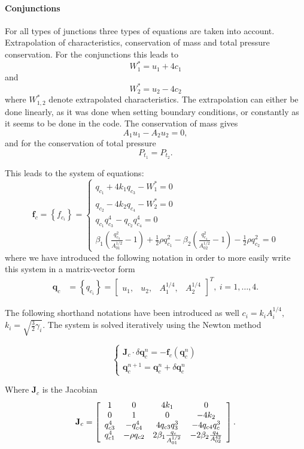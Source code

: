 \documentclass[a4paper, oneside]{discothesis}
\begin{document}
\paragraph{Conjunctions} \label{par:conjunctions}
For all types of junctions three types of equations are taken into account. 
Extrapolation of characteristics, conservation of mass and total pressure conservation.
For the conjunctions this leads to
$$
W_1^*=u_1+4 c_1
$$
and 
$$
W_2^*=u_2-4 c_2
$$
where $W_{1,2}^*$ denote extrapolated characteristics. 
The extrapolation can either be done linearly, as it was done when setting boundary conditions, or constantly as it seems to be done in the code. 
The conservation of mass gives
$$A_1 u_1-A_2 u_2=0,$$
and for the conservation of total pressure
$$P_{t_1}=P_{t_2}.$$

This leads to the system of equations:
$$
\mathbf{f}_c=\left\{f_{c_i}\right\}=\left\{\begin{array}{l}
		q_{c_1}+4 k_1 q_{c_3}-W_1^*=0 \\
		q_{c_2}-4 k_2 q_{c_4}-W_2^*=0 \\
		q_{c_1} q_{c_3}^4-q_{c_2} q_{c_4}^4=0 \\
		\beta_1\left(\frac{q_{c_3}^2}{A_{01}^{1 / 2}}-1\right)+\frac{1}{2} \rho q_{c_1}^2-\beta_2\left(\frac{q_{c_4}^2}{A_{02}^{1 / 2}}-1\right)-\frac{1}{2} \rho q_{c_2}^2=0
\end{array}\right.
$$
where we have introduced the following notation in order to more easily write this system in a matrix-vector form
$$
\begin{aligned}
	\mathbf{q}_c&=\left\{q_{c_i}\right\}=\left[\begin{array}{llll}
		u_1, & u_2, & A_1^{1 / 4}, & A_2^{1 / 4}
\end{array}\right]^T,\  i=1, \ldots, 4. 
\end{aligned}
$$

The following shorthand notations have been introduced as well $c_i=k_i A_i^{1 / 4},$  $k_i=\sqrt{\frac{3}{2} \gamma_i}$.
The system is solved iteratively using the Newton method

$$
\left\{\begin{array}{l}
		\mathbf{J}_c \cdot \delta \mathbf{q}_c^n=-\mathbf{f}_c\left(\mathbf{q}_c^n\right) \\
		\mathbf{q}_c^{n+1}=\mathbf{q}_c^n+\delta \mathbf{q}_c^n
\end{array}\right.
$$

Where $\mathbf{J}_c$ is the Jacobian
$$\mathbf{J}_{c}=\left[\begin{array}{c c c c}{{{1}}}&{{0}}&{{{4}k_{1}}}&{{0}}\\ {{0}}&{{{1}}}&{{0}}&{{-4k_{2}}}\\ {{q_{c3}^{4}}}&{{-q_{c4}^{4}}}&{{4q_{c3}q_{3}^{3}}}&{{-4q_{c4}q_{c}^{3}}}\\ {{q_{c1}^{4}}}&{{-\rho q_{c2}}}&{{2\beta_{1}\frac{q_{c}}{A_{01}^{1/2}}}}&{{-2\beta_{2}\frac{q_{4}}{A_{02}^{42}}}}\end{array}\right].$$
\end{document}
